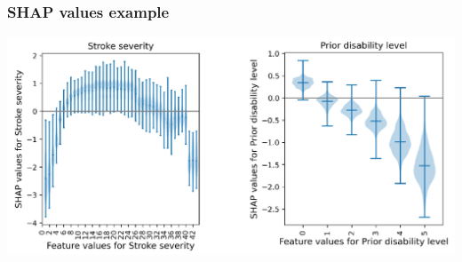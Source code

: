 \begin{frame}
\frametitle{SHAP values example}
\begin{center}
\includegraphics[width=1.0\textwidth]{./images/shap_example}
\end{center}
\end{frame}